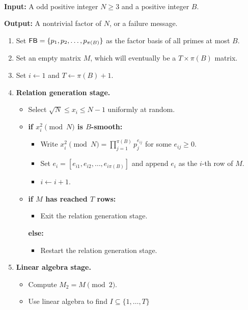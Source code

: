 \begin{algo}~

    {\bf Input:} A odd positive integer $N \geq 3$ and a positive integer $B$. 
    
    {\bf Output:} A nontrivial factor of $N$, or a failure message.
    \begin{enumerate}
        \item Set ${\sf FB} = \{p_1, p_2, \dots, p_{\pi(B)}\}$ as the factor 
        basis of all primes at most $B$. 
        \item Set an empty matrix $M$, which will eventually be a $T \times 
        \pi(B)$ matrix. 
        \item Set $i \gets 1$ and $T \gets \pi(B) + 1$. 
        \item {\bf Relation generation stage.}
        \begin{itemize}
            \item Select $\sqrt{N} \leq x_i \leq N-1$ uniformly at random. 
            \item {\bf if $x_i^2 \pmod N$ is $B$-smooth:}
            \begin{itemize}[$\circ$]
                \item Write $x_i^2 \pmod N = \prod_{j=1}^{\pi(B)} p_j^{e_{ij}}$ 
                for some $e_{ij} \geq 0$. 
                \item Set $e_i = [e_{i1}, e_{i2}, \dots, e_{i\pi(B)}]$ and append 
                $e_i$ as the $i$-th row of $M$.
                \item $i \gets i+1$.
            \end{itemize}
            \item {\bf if $M$ has reached $T$ rows:}
            \begin{itemize}[$\circ$]
                \item Exit the relation generation stage.
            \end{itemize}
            {\bf else:}
            \begin{itemize}[$\circ$]
                \item Restart the relation generation stage. 
            \end{itemize}
        \end{itemize}
        \item {\bf Linear algebra stage.}
        \begin{itemize}
            \item Compute $M_2 = M \pmod 2$. 
            \item Use linear algebra to find $I \subseteq \{1, \dots, T\}$ 

\end{itemize}
\end{enumerate}
\end{algo}
